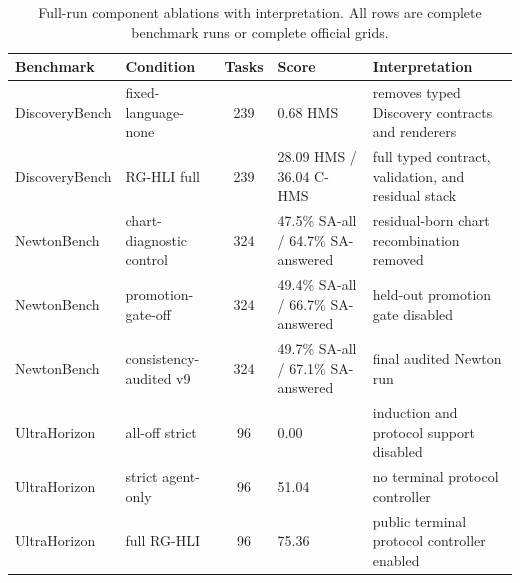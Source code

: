 \documentclass[letterpaper]{article}
\newcommand{\tblhdr}{\rowcolor{headerrow}}
\newcommand{\methodshort}{\textsc{RG-HLI}\xspace}
\begin{document}
\begin{table}[H]
\centering
\caption{Full-run component ablations with interpretation. All rows are
complete benchmark runs or complete official grids.}
\label{tab:ablations}
\small
\setlength{\tabcolsep}{5pt}
\begin{tabularx}{0.96\textwidth}{@{}llcYY@{}}
\toprule
\tblhdr
Benchmark & Condition & Tasks & Score & Interpretation \\
\midrule
{}
DiscoveryBench & fixed-language-none & 239 & 0.68 HMS & removes typed Discovery contracts and renderers \\
DiscoveryBench & \methodshort full & 239 & 28.09 HMS / 36.04 C-HMS & full typed contract, validation, and residual stack \\
\midrule
{}
NewtonBench & chart-diagnostic control & 324 & 47.5\% SA-all / 64.7\% SA-answered & residual-born chart recombination removed \\
NewtonBench & promotion-gate-off & 324 & 49.4\% SA-all / 66.7\% SA-answered & held-out promotion gate disabled \\
NewtonBench & consistency-audited v9 & 324 & 49.7\% SA-all / 67.1\% SA-answered & final audited Newton run \\
\midrule
{}
UltraHorizon & all-off strict & 96 & 0.00 & induction and protocol support disabled \\
UltraHorizon & strict agent-only & 96 & 51.04 & no terminal protocol controller \\
UltraHorizon & full \methodshort & 96 & 75.36 & public terminal protocol controller enabled \\
\bottomrule
\end{tabularx}
\end{table}
\end{document}
